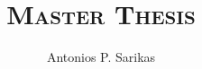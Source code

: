 \documentclass[chapterprefix=true]{scrreport}
\author{Antonios P. Sarikas}
\title{\scshape Master Thesis}
\begin{document}


%
%
%

%
%
%

\printindex
\printglossaries
\end{document}
